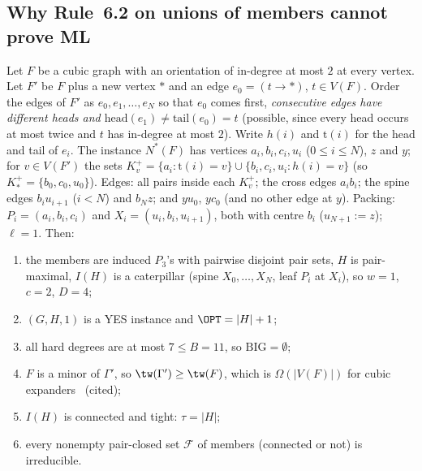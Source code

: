 \subsection{Why Rule~6.2 on unions of members cannot prove ML}
\begin{proposition}\label{prop:five}
Let $F$ be a cubic graph with an orientation of in-degree at most $2$ at every vertex. Let $F'$ be $F$ plus a new vertex $*$ and an edge $e_0=(t\to *)$, $t\in V(F)$. Order the edges of $F'$ as $e_0,e_1,\dots,e_N$ so that $e_0$ comes first, \emph{consecutive edges have different heads and $\mathrm{head}(e_1)\ne\mathrm{tail}(e_0)=t$} (possible, since every head occurs at most twice and $t$ has in-degree at most $2$). Write $h(i)$ and $\mathrm{t}(i)$ for the head and tail of $e_i$. The instance $N^*(F)$ has vertices $a_i,b_i,c_i,u_i$ ($0\le i\le N$), $z$ and $y$; for $v\in V(F')$ the sets $K_v^+=\{a_i:\mathrm t(i)=v\}\cup\{b_i,c_i,u_i:h(i)=v\}$ (so $K_*^+=\{b_0,c_0,u_0\}$). Edges: all pairs inside each $K_v^+$; the cross edges $a_ib_i$; the spine edges $b_iu_{i+1}$ ($i<N$) and $b_Nz$; and $yu_0$, $yc_0$ (and no other edge at $y$). Packing: $P_i=(a_i,b_i,c_i)$ and $X_i=(u_i,b_i,u_{i+1})$, both with centre $b_i$ ($u_{N+1}:=z$); $\ell=1$. Then:
\begin{enumerate}
\item[(F1)] the members are induced $P_3$'s with pairwise disjoint pair sets, $H$ is pair-maximal, $I(H)$ is a caterpillar (spine $X_0,\dots,X_N$, leaf $P_i$ at $X_i$), so $w=1$, $c=2$, $D=4$;
\item[(F2)] $(G,H,1)$ is a YES instance and $\OPT=|H|+1$;
\item[(F3)] all hard degrees are at most $7\le B=11$, so $\mathrm{BIG}=\emptyset$;
\item[(F4)] $F$ is a minor of $\Gamma'$, so $\tw(\Gamma')\ge\tw(F)$, which is $\Omega(|V(F)|)$ for cubic expanders~\cite{GM09} (cited);
\item[(F5)] $I(H)$ is connected and tight: $\tau=|H|$;
\item[(F6)] every nonempty pair-closed set $\mathcal F$ of members (connected or not) is irreducible.
\end{enumerate}
\end{proposition}
